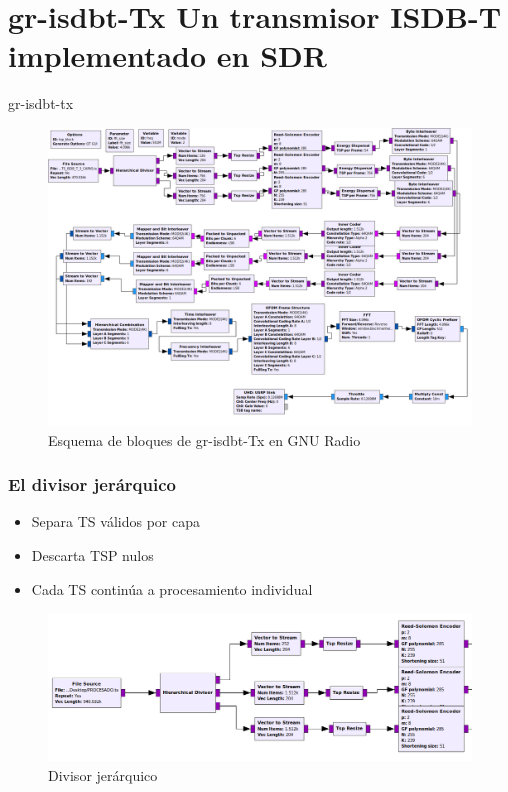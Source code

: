 \section{gr-isdbt-Tx Un transmisor ISDB-T implementado en SDR}

\begin{frame}{gr-isdbt-tx}
\begin{figure}
	\includegraphics[scale=0.20]{flowgraphEdited}
	\caption{Esquema de bloques de gr-isdbt-Tx en GNU Radio}
\end{figure}
\end{frame}

\begin{frame}
\frametitle{El divisor jerárquico}
	\begin{itemize}	
		\item { Separa TS válidos por capa}
		\item {	Descarta TSP nulos }
		\item { Cada TS continúa a procesamiento individual }
	\end{itemize}
	\begin{figure}
		\includegraphics[scale=0.25]{h_div}
		\caption{Divisor jerárquico}
	\end{figure}
\end{frame}


